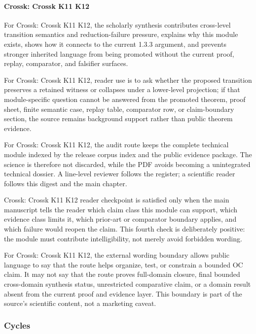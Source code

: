 \paragraph{Crossk: Crossk K11 K12}

For Crossk: Crossk K11 K12, the scholarly synthesis contributes cross-level transition semantics and reduction-failure pressure, explains why this module exists, shows how it connects to the current 1.3.3 argument, and prevents stronger inherited language from being promoted without the current proof, replay, comparator, and falsifier surfaces.


For Crossk: Crossk K11 K12, reader use is to ask whether the proposed transition preserves a retained witness or collapses under a lower-level projection; if that module-specific question cannot be answered from the promoted theorem, proof sheet, finite semantic case, replay table, comparator row, or claim-boundary section, the source remains background support rather than public theorem evidence.


For Crossk: Crossk K11 K12, the audit route keeps the complete technical module indexed by the release corpus index and the public evidence package. The science is therefore not discarded, while the PDF avoids becoming a unintegrated technical dossier. A line-level reviewer follows the register; a scientific reader follows this digest and the main chapter.


Crossk: Crossk K11 K12 reader checkpoint is satisfied only when the main manuscript tells the reader which claim class this module can support, which evidence class limits it, which prior-art or comparator boundary applies, and which failure would reopen the claim. This fourth check is deliberately positive: the module must contribute intelligibility, not merely avoid forbidden wording.


For Crossk: Crossk K11 K12, the external wording boundary allows public language to say that the route helps organize, test, or constrain a bounded OC claim. It may not say that the route proves full-domain closure, final bounded cross-domain synthesis status, unrestricted comparative claim, or a domain result absent from the current proof and evidence layer. This boundary is part of the source's scientific content, not a marketing caveat.


\subsubsection{Cycles}

